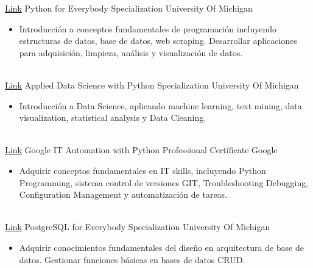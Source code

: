 \documentclass[letterpaper]{DS_class_file} %
\begin{document}
\begin{twenty} %
	\twentyitem
	{\href{https://www.coursera.org/specializations/python?page=7}{Link}}
	{}
	{\hspace{0.1cm}Python for Everybody Specialization}
	{University Of Michigan}
	{}
	{
		{\begin{itemize}
				\item Introducción a conceptos fundamentales de programación incluyendo estructuras de datos, base de datos, web scraping. Desarrollar aplicaciones para adquisición, limpieza, análisis y visualización de datos.
		\end{itemize}}
	}
	\\
	\twentyitem
	{\href{https://www.coursera.org/specializations/data-science-python}{Link}}
	{}
	{\hspace{0.1cm}Applied Data Science with Python Specialization}
	{University Of Michigan}
	{}
	{
		{\begin{itemize}
				\item Introducción a Data Science, aplicando machine learning, text mining, data visualization, statistical analysis  y Data Cleaning. 
		\end{itemize}}
	}
	\\
	\twentyitem
	{\href{https://www.coursera.org/professional-certificates/google-it-automation}{Link}}
	{}
	{\hspace{0.1cm}Google IT Automation with Python Professional Certificate}
	{Google }
	{}
	{
		{\begin{itemize}
				\item Adquirir conceptos fundamentales en IT skills, incluyendo Python Programming, sistema control de versiones GIT, Troubleshooting  Debugging, Configuration Management  y automatización de tareas. 
		\end{itemize}}
	}
	\\
	\twentyitem
	{\href{https://www.coursera.org/specializations/postgresql-for-everybody}{Link}}
	{}
	{\hspace{0.1cm}PostgreSQL for Everybody Specialization}
	{University Of Michigan}
	{}
	{
		{\begin{itemize}
				\item Adquirir conocimientos fundamentales del diseño en arquitectura de base de datos. Gestionar funciones básicas en bases de datos CRUD.
		\end{itemize}}
}
\end{twenty}
\end{document}

